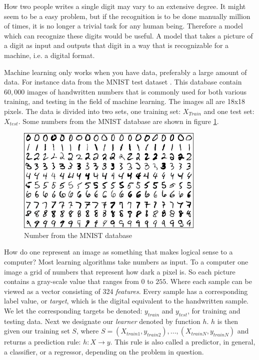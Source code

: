 	How two people writes a single digit may vary to an extensive degree. It might seem to be a easy problem, but if the recognition is to be done manually million of times, it is no longer a trivial task for any human being. Therefore a model which can recognize these digits would be useful. A model that takes a picture of a digit as input and outputs that digit in a way that is recognizable for a machine, i.e. a digital format.
	
	Machine learning only works when you have data, preferably a large amount of data. For instance data from the MNIST test dataset \cite{lecun1998gradient}. This database contain $60,000$ images of handwritten numbers that is commonly used for both various training, and testing in the field of machine learning. The images all are 18x18 pixels. The data is divided into two sets, one training set: $X_{Train}$ and one test set: $X_{test}$. Some numbers from the MNIST database are shown in figure \ref{fig:MNIST}.
	
\begin{figure}[ht]
    \centering
    \includegraphics[width=0.8\textwidth]{theory/figures/MNIST.png}
    \caption{Number from the MNIST database \cite{MNIST}}
    \label{fig:MNIST}
\end{figure}
	
	How do one represent an image as something that makes logical sense to a computer? Most learning algorithms take numbers as input. To a computer one image a grid of numbers that represent how dark a pixel is. So each picture contains a gray-scale value that ranges from $0$ to $255$. Where each sample can be viewed as a vector consisting of 324 \textit{features}. Every sample has a corresponding label value, or \textit{target}, which is the digital equivalent to the handwritten sample. We let the corresponding targets be denoted: $y_{train}$ and $y_{test}$, for training and testing data. Next we designate our \textit{learner} denoted by function $h$. $h$ is then given our training set $S$, where $S = (X_{train1}, y_{train2}),..., (X_{trainN}, y_{trainN})$ and returns a prediction rule: $h: X \rightarrow y$. This rule is also called a predictor, in general, a classifier, or a regressor, depending on the problem in question.
	
